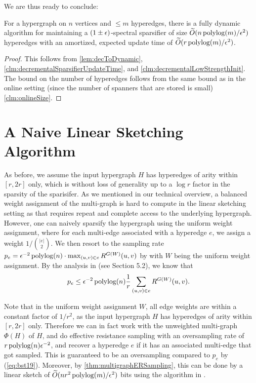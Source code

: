 \documentclass{article}
\begin{document}
We are thus ready to conclude:

\begin{theorem}
    For a hypergraph on $n$ vertices and $\leq m$ hyperedges, there is a fully dynamic algorithm for maintaining a $(1 \pm \epsilon)$-spectral sparsifier of size $\widetilde{O}(n \operatorname{polylog}(m) / \epsilon^2)$ hyperedges with an amortized, expected update time of $\widetilde{O}(r \operatorname{polylog}(m) / \epsilon^2)$.
\end{theorem}

\begin{proof}
    This follows from \cref{lem:decToDynamic}, \cref{clm:decrementalSparsifierUpdateTime}, and \cref{clm:decrementalLowStrengthInit}. The bound on the number of hyperedges follows from the same bound as in the online setting (since the number of spanners that are stored is small) \cref{clm:onlineSize}.
\end{proof}







\newpage 
\appendix

\section{A Naive Linear Sketching Algorithm}\label{sec:lsnaive}

As before, we assume the input hypergraph $H$ has hyperedges of arity within $[r,2r]$ only,
which is without loss of generality up to a $\log r$ factor in the sparsity of the sparisifer.
As we mentioned in our technical overview, a balanced weight assignment of the
multi-graph is hard to compute in the linear sketching setting as that requires repeat
and complete access to the underlying hypergraph.
However, one can naively sparsify the hypergraph using the uniform weight assignment,
where for each multi-edge associated with a hyperedge $e$, we assign a weight
$1/\binom{|e|}{2}$.
We then resort to the sampling rate
$p_e = \epsilon^{-2} \operatorname{polylog}(n)\cdot \max_{(u,v) \in e} R^{G(W)}(u,v)$
by \cite{KKTY21b,Lee23,JambulapatiLS23} with $W$ being the uniform weight assignment.
By the analysis in \cite{BansalST19} (see Section 5.2), we know that
\begin{align}\label{eq:bst19}
p_e \leq \epsilon^{-2} \operatorname{polylog}(n) \frac{1}{r} \sum_{(u,v)\in e} R^{G(W)}(u,v).
\end{align}

Note that in the uniform weight assignment $W$, all edge weights are within a constant factor
of $1/r^2$,
as the input hypergraph $H$ has hyperedges of arity within $[r,2r]$ only.
Therefore we can in fact work with the unweighted multi-graph $\Phi(H)$ of $H$,
and do effective resistance sampling with an oversampling rate
of $r\operatorname{polylog}(n)\epsilon^{-2}$, and recover a hyperedge $e$ if it has an associated multi-edge
that got sampled.
This is guaranteed to be an oversampling compared to $p_e$ by (\ref{eq:bst19}).
Moreover, by \cref{thm:multigraphERSampling},
this can be done by a linear sketch of $\widetilde{O}(nr^2 \operatorname{polylog}(m) / \epsilon^2)$ bits
using the algorithm in \cite{KLMMS14}.
\end{document}
